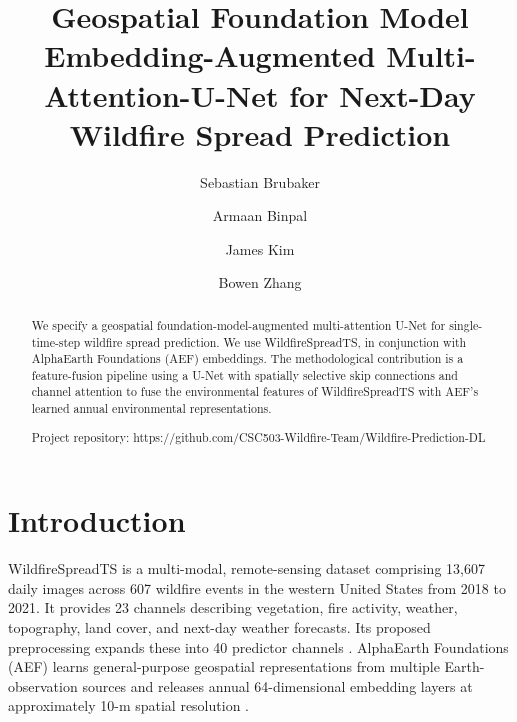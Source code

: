 \documentclass[sigconf]{acmart}
\begin{document}
\title{Geospatial Foundation Model Embedding-Augmented Multi-Attention-U-Net for Next-Day Wildfire Spread Prediction}

\author{Sebastian Brubaker}

\author{Armaan Binpal}

\author{James Kim}

\author{Bowen Zhang}


\begin{abstract}
We specify a geospatial foundation-model-augmented multi-attention U-Net for single-time-step wildfire spread prediction. We use WildfireSpreadTS,  
in conjunction with AlphaEarth Foundations (AEF) embeddings. The methodological contribution is a feature-fusion pipeline using a U-Net 
with spatially selective skip connections and channel attention to fuse the environmental features of WildfireSpreadTS with AEF's learned 
annual environmental representations. 

Project repository: https://github.com/CSC503-Wildfire-Team/Wildfire-Prediction-DL
\end{abstract}

\maketitle

\section{Introduction}
WildfireSpreadTS is a multi-modal, remote-sensing dataset comprising 13,607 daily images across 607 wildfire events in the western United 
States from 2018 to 2021. It provides 23 channels describing vegetation, fire activity, weather, topography, land cover, and next-day weather 
forecasts. Its proposed preprocessing expands these into 40 predictor channels \cite{gerard2023wildfirespreadts}. AlphaEarth Foundations (AEF) 
learns general-purpose geospatial representations from multiple Earth-observation sources and releases annual 64-dimensional embedding 
layers at approximately 10-m spatial resolution \cite{brown}. 
\end{document}
